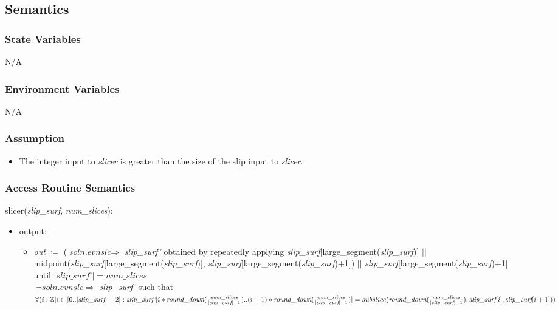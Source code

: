 \documentclass[12pt, titlepage]{article}
\begin{document}
\subsection{Semantics}

\subsubsection{State Variables}
N/A

\subsubsection{Environment Variables}
N/A

\subsubsection{Assumption}
\begin{itemize}
	\item The integer input to \textit{slicer} is greater than the size of the 
	slip input to \textit{slicer}.
\end{itemize}

\subsubsection{Access Routine Semantics}
slicer(\textit{slip\_surf}, \textit{num\_slices}):
\begin{itemize}
	\item output:
	\begin{itemize}
		\item[] \textit{out} $\coloneqq$ ($\textit{soln.evnslc} \Rightarrow$ 
		\textit{slip\_surf'} obtained by repeatedly applying 
		\textit{slip\_surf}[large\_segment(\textit{slip\_surf})] $||$ 
		midpoint(\textit{slip\_surf}[large\_segment(\textit{slip\_surf})], 
		\textit{slip\_surf}[large\_segment(\textit{slip\_surf})+1])
		$||$ \textit{slip\_surf}[large\_segment(\textit{slip\_surf})+1] until 
		$|\textit{slip\_surf'}| = \textit{num\_slices}$ \\
		$| \lnot \textit{soln.evnslc} \Rightarrow$ \textit{slip\_surf'} such 
		that 
		$\forall(i : \mathbb{Z} | i \in [0..|\textit{slip\_surf}|-2] : 
		\textit{slip\_surf'}[i*\textit{round\_down}(\frac{\textit{num\_slices}}
		{|\textit{slip\_surf}|-1})..(i+1)*\textit{round\_down}(\frac{\textit{num\_slices}}
		{|\textit{slip\_surf}|-1})] = \\
		subslice(\textit{round\_down}(\frac{\textit{num\_slices}}
		{|\textit{slip\_surf}|-1}), \textit{slip\_surf}[i], 
		\textit{slip\_surf}[i+1]))$
	\end{itemize}
\end{itemize}
\end{document}
